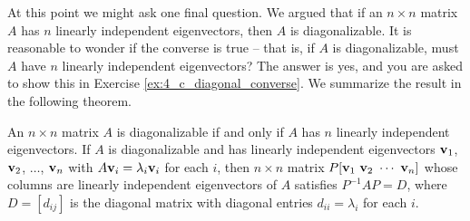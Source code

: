 At this point we might ask one final question. We argued that if an $n \times n$ matrix $A$ has $n$ linearly independent eigenvectors, then $A$ is diagonalizable. It is reasonable to wonder if the converse is true -- that is, if $A$ is diagonalizable, must $A$ have $n$ linearly independent eigenvectors? The answer is yes, and you are asked to show this in Exercise \ref{ex:4_c_diagonal_converse}. We summarize the result in the following theorem.

\begin{theorem} An $n \times n$ matrix $A$ is diagonalizable if and only if $A$ has $n$ linearly independent eigenvectors. If $A$ is diagonalizable and has linearly independent eigenvectors $\mathbf{v}_1$, $\mathbf{v}_2$, $\ldots$, $\mathbf{v}_n$ with $A\mathbf{v}_i = \lambda_i \mathbf{v}_i$ for each $i$, then $n \times n$ matrix $P [ \vv_1 \ \vv_2 \ \cdots \ \vv_n]$ whose columns are linearly independent eigenvectors of $A$ satisfies $P^{-1}AP = D$, where $D = [d_{ij}]$ is the diagonal matrix  with diagonal entries $d_{ii} = \lambda_i$ for each $i$.
\end{theorem}


\label{sec:diag_exam}

\ExampleIntro

